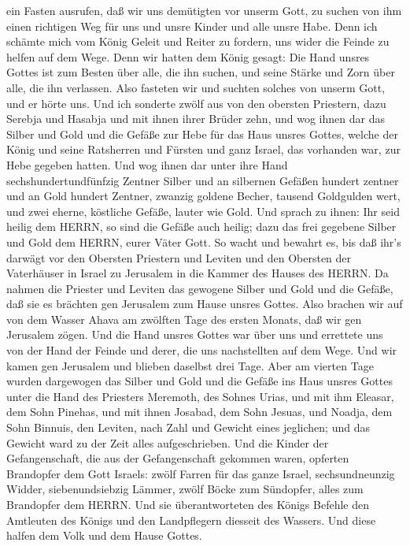 ein Fasten ausrufen, daß wir uns demütigten vor unserm Gott, zu suchen
von ihm einen richtigen Weg für uns und unsre Kinder und alle unsre
Habe.  Denn ich schämte mich vom König Geleit und Reiter zu
fordern, uns wider die Feinde zu helfen auf dem Wege. Denn wir hatten
dem König gesagt: Die Hand unsres Gottes ist zum Besten über alle, die
ihn suchen, und seine Stärke und Zorn über alle, die ihn verlassen.
 Also fasteten wir und suchten solches von unserm Gott, und
er hörte uns.  Und ich sonderte zwölf aus von den obersten
Priestern, dazu Serebja und Hasabja und mit ihnen ihrer Brüder zehn,
 und wog ihnen dar das Silber und Gold und die Gefäße zur
Hebe für das Haus unsres Gottes, welche der König und seine Ratsherren
und Fürsten und ganz Israel, das vorhanden war, zur Hebe gegeben hatten.
 Und wog ihnen dar unter ihre Hand sechshundertundfünfzig
Zentner Silber und an silbernen Gefäßen hundert zentner und an Gold
hundert Zentner,  zwanzig goldene Becher, tausend
Goldgulden wert, und zwei eherne, köstliche Gefäße, lauter wie Gold.
 Und sprach zu ihnen: Ihr seid heilig dem HERRN, so sind
die Gefäße auch heilig; dazu das frei gegebene Silber und Gold dem
HERRN, eurer Väter Gott.  So wacht und bewahrt es, bis daß
ihr's darwägt vor den Obersten Priestern und Leviten und den Obersten
der Vaterhäuser in Israel zu Jerusalem in die Kammer des Hauses des
HERRN.  Da nahmen die Priester und Leviten das gewogene
Silber und Gold und die Gefäße, daß sie es brächten gen Jerusalem zum
Hause unsres Gottes.  Also brachen wir auf von dem Wasser
Ahava am zwölften Tage des ersten Monats, daß wir gen Jerusalem zögen.
Und die Hand unsres Gottes war über uns und errettete uns von der Hand
der Feinde und derer, die uns nachstellten auf dem Wege. 
Und wir kamen gen Jerusalem und blieben daselbst drei Tage.
 Aber am vierten Tage wurden dargewogen das Silber und Gold
und die Gefäße ins Haus unsres Gottes unter die Hand des Priesters
Meremoth, des Sohnes Urias, und mit ihm Eleasar, dem Sohn Pinehas, und
mit ihnen Josabad, dem Sohn Jesuas, und Noadja, dem Sohn Binnuis, den
Leviten,  nach Zahl und Gewicht eines jeglichen; und das
Gewicht ward zu der Zeit alles aufgeschrieben.  Und die
Kinder der Gefangenschaft, die aus der Gefangenschaft gekommen waren,
opferten Brandopfer dem Gott Israels: zwölf Farren für das ganze Israel,
sechsundneunzig Widder, siebenundsiebzig Lämmer, zwölf Böcke zum
Sündopfer, alles zum Brandopfer dem HERRN.  Und sie
überantworteten des Königs Befehle den Amtleuten des Königs und den
Landpflegern diesseit des Wassers. Und diese halfen dem Volk und dem
Hause Gottes.

